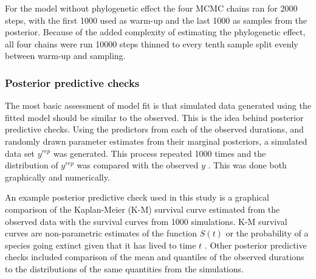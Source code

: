 \documentclass[12pt,letterpaper]{article}
\begin{document}
For the model without phylogenetic effect the four MCMC chains ran for 2000 steps, with the first 1000 used as warm-up and the last 1000 as samples from the posterior. Because of the added complexity of estimating the phylogenetic effect, all four chains were run 10000 steps thinned to every tenth sample split evenly between warm-up and sampling. 



\subsubsection{Posterior predictive checks}

The most basic assessment of model fit is that simulated data generated using the fitted model should be similar to the observed. This is the idea behind posterior predictive checks. Using the predictors from each of the observed durations, and randomly drawn parameter estimates from their marginal posteriors, a simulated data set \(y^{rep}\) was generated. This process repeated 1000 times and the distribution of \(y^{rep}\) was compared with the observed \(y\) \citep{Gelman2013d}. This was done both graphically and numerically.

An example posterior predictive check used in this study is a graphical comparison of the Kaplan-Meier (K-M) survival curve estimated from the observed data with the survival curves from 1000 simulations. K-M survival curves are non-parametric estimates of the function \(S(t)\) or the probability of a species going extinct given that it has lived to time \(t\) \citep{Kleinbaum2005}. Other posterior predictive checks included comparison of the mean and quantiles of the observed durations to the distributions of the same quantities from the simulations.
\end{document}

